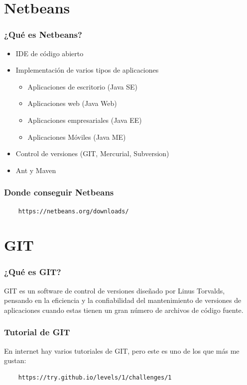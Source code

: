 \documentclass{beamer}
\begin{document}
\section{Netbeans}

\begin{frame}
  \frametitle{¿Qué es Netbeans?}
  \begin{itemize}
  \item IDE de código abierto
  \item Implementación de varios tipos de aplicaciones
    \begin{itemize}
    \item Aplicaciones de escritorio (Java SE)
    \item Aplicaciones web (Java Web)
    \item Aplicaciones empresariales (Java EE)
    \item Aplicaciones Móviles (Java ME)
    \end{itemize}
  \item Control de versiones (GIT, Mercurial, Subversion)
  \item Ant y Maven
  \end{itemize}
\end{frame}


\begin{frame}[fragile]
  \frametitle{Donde conseguir Netbeans}
  \begin{verbatim}
    https://netbeans.org/downloads/
  \end{verbatim}
\end{frame}

\section{GIT}

\begin{frame}
  \frametitle{¿Qué es GIT?}
  GIT es un software de control de versiones diseñado por Linus
  Torvalds, pensando en la eficiencia y la confiabilidad del
  mantenimiento de versiones de aplicaciones cuando estas tienen un
  gran número de archivos de código fuente.
\end{frame}

\begin{frame}[fragile]
  \frametitle{Tutorial de GIT}
  En internet hay varios tutoriales de GIT, pero este es uno de los que más me
  gustan:
  \begin{verbatim}
    https://try.github.io/levels/1/challenges/1
  \end{verbatim}
\end{frame}
\end{document}
